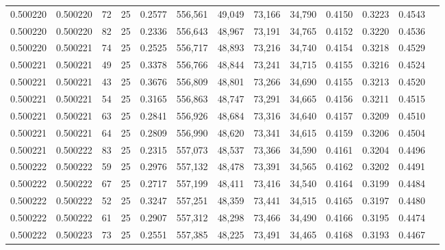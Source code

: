 \begin{tabular}{rrrrrrrrrrrrr}
0.500220 & 0.500220 &    72 &  25 &                                     0.2577 & 556,561 &  49,049 &  73,166 &  34,790 & 0.4150 & 0.3223 & 0.4543 \\
0.500220 & 0.500220 &    82 &  25 &                                     0.2336 & 556,643 &  48,967 &  73,191 &  34,765 & 0.4152 & 0.3220 & 0.4536 \\
0.500220 & 0.500221 &    74 &  25 &                                     0.2525 & 556,717 &  48,893 &  73,216 &  34,740 & 0.4154 & 0.3218 & 0.4529 \\
0.500221 & 0.500221 &    49 &  25 &                                     0.3378 & 556,766 &  48,844 &  73,241 &  34,715 & 0.4155 & 0.3216 & 0.4524 \\
0.500221 & 0.500221 &    43 &  25 &                                     0.3676 & 556,809 &  48,801 &  73,266 &  34,690 & 0.4155 & 0.3213 & 0.4520 \\
0.500221 & 0.500221 &    54 &  25 &                                     0.3165 & 556,863 &  48,747 &  73,291 &  34,665 & 0.4156 & 0.3211 & 0.4515 \\
0.500221 & 0.500221 &    63 &  25 &                                     0.2841 & 556,926 &  48,684 &  73,316 &  34,640 & 0.4157 & 0.3209 & 0.4510 \\
0.500221 & 0.500221 &    64 &  25 &                                     0.2809 & 556,990 &  48,620 &  73,341 &  34,615 & 0.4159 & 0.3206 & 0.4504 \\
0.500221 & 0.500222 &    83 &  25 &                                     0.2315 & 557,073 &  48,537 &  73,366 &  34,590 & 0.4161 & 0.3204 & 0.4496 \\
0.500222 & 0.500222 &    59 &  25 &                                     0.2976 & 557,132 &  48,478 &  73,391 &  34,565 & 0.4162 & 0.3202 & 0.4491 \\
0.500222 & 0.500222 &    67 &  25 &                                     0.2717 & 557,199 &  48,411 &  73,416 &  34,540 & 0.4164 & 0.3199 & 0.4484 \\
0.500222 & 0.500222 &    52 &  25 &                                     0.3247 & 557,251 &  48,359 &  73,441 &  34,515 & 0.4165 & 0.3197 & 0.4480 \\
0.500222 & 0.500222 &    61 &  25 &                                     0.2907 & 557,312 &  48,298 &  73,466 &  34,490 & 0.4166 & 0.3195 & 0.4474 \\
0.500222 & 0.500223 &    73 &  25 &                                     0.2551 & 557,385 &  48,225 &  73,491 &  34,465 & 0.4168 & 0.3193 & 0.4467 \\

\end{tabular}
